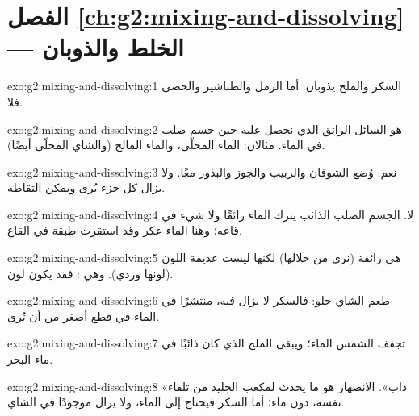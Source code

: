 \section*{الفصل \ref{ch:g2:mixing-and-dissolving} --- الخلط والذوبان}

\begin{solution}{exo:g2:mixing-and-dissolving:1}
السكر والملح يذوبان. أما الرمل والطباشير والحصى فلا.
\end{solution}

\begin{solution}{exo:g2:mixing-and-dissolving:2}
 هو السائل الرائق الذي نحصل عليه حين  جسم صلب في الماء.
مثالان: الماء المحلّى، والماء المالح (والشاي المحلّى  أيضًا).
\end{solution}

\begin{solution}{exo:g2:mixing-and-dissolving:3}
نعم: وُضع الشوفان والزبيب والجوز والبذور معًا. ولا يزال كل جزء يُرى
ويمكن التقاطه.
\end{solution}

\begin{solution}{exo:g2:mixing-and-dissolving:4}
لا. الجسم الصلب الذائب يترك الماء رائقًا ولا شيء في قاعه؛ وهنا الماء
عكر وقد استقرت طبقة في القاع.
\end{solution}

\begin{solution}{exo:g2:mixing-and-dissolving:5}
هي رائقة (نرى من خلالها) لكنها ليست عديمة اللون (لونها وردي). وهي
: فقد يكون  لون.
\end{solution}

\begin{solution}{exo:g2:mixing-and-dissolving:6}
طعم الشاي حلو: فالسكر لا يزال فيه، منتشرًا في الماء في قطع أصغر من أن
تُرى.
\end{solution}

\begin{solution}{exo:g2:mixing-and-dissolving:7}
تجفف الشمس الماء؛ ويبقى الملح الذي كان ذائبًا في ماء
البحر.
\end{solution}

\begin{solution}{exo:g2:mixing-and-dissolving:8}
«ذاب». الانصهار هو ما يحدث لمكعب الجليد من تلقاء نفسه، دون ماء؛
أما السكر فيحتاج إلى الماء، ولا يزال موجودًا في الشاي.
\end{solution}

